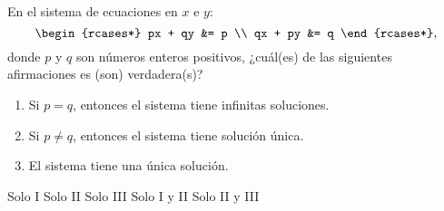 \documentclass{sn-guia}
\begin{document}
\begin{problemas}
    \problema En el sistema de ecuaciones en $x$ e $y$:
    \begin{equation*}
        \begin{rcases*}
            px + qy &= p \\
            qx + py &= q 
        \end{rcases*},
    \end{equation*}
    donde $p$ y $q$ son números enteros positivos, ¿cuál(es) de las siguientes 
    afirmaciones es (son) verdadera(s)?
    \begin{enumerate}[label=\Roman*),leftmargin=2cm]
        \item Si $p=q$, entonces el sistema tiene infinitas soluciones.
        \item Si $p\neq q$, entonces el sistema tiene solución única.
        \item El sistema tiene una única solución.
    \end{enumerate}
    \begin{alternativas}[]
        \alternativa Solo I
        \alternativa Solo II
        \alternativa Solo III
        \alternativa Solo I y II
        \alternativa Solo II y III
    \end{alternativas}


\end{problemas}
\end{document}
